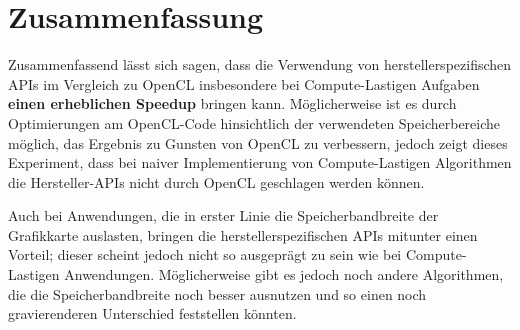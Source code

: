 \documentclass[12pt]{article}
\begin{document}
	\section*{Zusammenfassung}
	Zusammenfassend lässt sich sagen, dass die Verwendung von herstellerspezifischen APIs im Vergleich zu OpenCL insbesondere bei Compute-Lastigen Aufgaben \textbf{einen erheblichen Speedup} bringen kann.
	Möglicherweise ist es durch Optimierungen am OpenCL-Code hinsichtlich der verwendeten Speicherbereiche möglich, das Ergebnis zu Gunsten von OpenCL zu verbessern, jedoch zeigt dieses Experiment, dass bei naiver Implementierung von Compute-Lastigen Algorithmen die Hersteller-APIs nicht durch OpenCL geschlagen werden können.
	
	Auch bei Anwendungen, die in erster Linie die Speicherbandbreite der Grafikkarte auslasten, bringen die herstellerspezifischen APIs mitunter einen Vorteil; dieser scheint jedoch nicht so ausgeprägt zu sein wie bei Compute-Lastigen Anwendungen.
	Möglicherweise gibt es jedoch noch andere Algorithmen, die die Speicherbandbreite noch besser ausnutzen und so einen noch gravierenderen Unterschied feststellen könnten.
	
\end{document}
